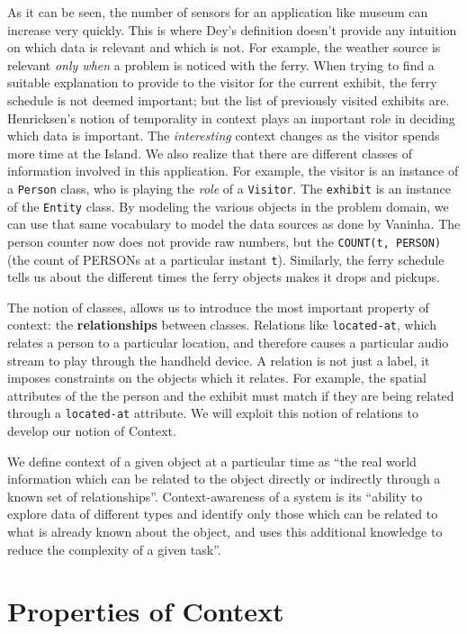 As it can be seen, the number of sensors for an application like museum can increase very quickly. This is where Dey's definition doesn't provide any intuition on which data is relevant and which is not. For example, the weather source is relevant \textit{only when} a problem is noticed with the ferry. When trying to find a suitable explanation to provide to the visitor for the current exhibit, the ferry schedule is not deemed important; but the list of previously visited exhibits are. Henricksen's notion of temporality in context plays an important role in deciding which data is important. The \textit{interesting} context changes as the visitor spends more time at the Island. We also realize that there are different classes of information involved in this application. For example, the visitor is an instance of a \texttt{Person} class, who is playing the \textit{role} of a \texttt{Visitor}. The \texttt{exhibit} is an instance of the \texttt{Entity} class. By modeling the various objects in the problem domain, we can use that same vocabulary to model the data sources as done by Vaninha. The person counter now does not provide raw numbers, but the \texttt{COUNT(t, PERSON)} (the count of PERSONs at a particular instant \texttt{t}). Similarly, the ferry schedule tells us about the different times the ferry objects makes it drops and pickups. 

The notion of classes, allows us to introduce the most important property of context: the \textbf{relationships} between classes. Relations like \texttt{located-at}, which relates a person to a particular location, and therefore causes a particular audio stream to play through the handheld device. A relation is not just a label, it imposes constraints on the objects which it relates. For example, the spatial attributes of the the person and the exhibit must match if they are being related through a \texttt{located-at} attribute. We will exploit this notion of relations to develop our notion of Context.

We define context of a given object at a particular time as ``the real world information which can be related to the object directly or indirectly through a known set of relationships''. Context-awareness of a system is its ``ability to explore data of different types and identify only those which can be related to what is already known about the object, and uses this additional knowledge to reduce the complexity of a given task''.

\section{Properties of Context}


